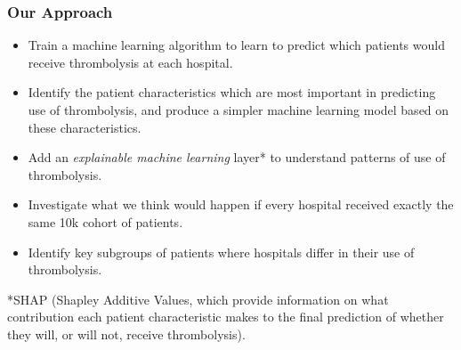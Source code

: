 \begin{frame}
\frametitle{Our Approach}

\small

\begin{itemize}
    \item Train a machine learning algorithm to learn to predict which patients would receive thrombolysis at each hospital.
    \item Identify the patient characteristics which are most important in predicting use of thrombolysis, and produce a simpler machine learning model based on these characteristics.
    \item Add an \emph{explainable machine learning} layer* to understand patterns of use of thrombolysis.
    \item Investigate what we think would happen if every hospital received exactly the same 10k cohort of patients.
    \item Identify key subgroups of patients where hospitals differ in their use of thrombolysis.
\end{itemize}

\vspace{3mm}
\footnotesize
*SHAP (Shapley Additive Values, which provide information on what contribution each patient characteristic makes to the final prediction of whether they will, or will not, receive thrombolysis).
\end{frame}